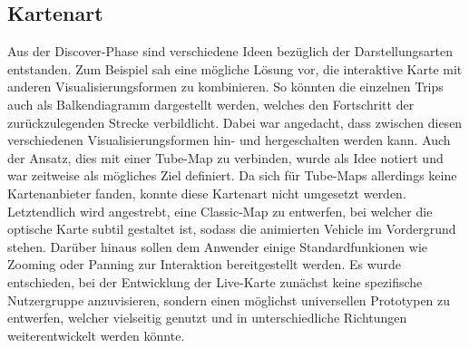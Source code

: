 \subsection{Kartenart}
\label{ssub:kartenart}
  Aus der Discover-Phase sind verschiedene Ideen bezüglich der Darstellungsarten entstanden. Zum Beispiel sah eine mögliche Lösung vor, die interaktive Karte mit anderen Visualisierungsformen zu kombinieren. So könnten die einzelnen Trips auch als Balkendiagramm dargestellt werden, welches den Fortschritt der zurückzulegenden Strecke verbildlicht. Dabei war angedacht, dass zwischen diesen verschiedenen Visualisierungsformen hin- und hergeschalten werden kann. Auch der Ansatz, dies mit einer Tube-Map zu verbinden, wurde als Idee notiert und war zeitweise als mögliches Ziel definiert. Da sich für Tube-Maps allerdings keine Kartenanbieter fanden, konnte diese Kartenart nicht umgesetzt werden.
  Letztendlich wird angestrebt, eine Classic-Map zu entwerfen, bei welcher die optische Karte subtil gestaltet ist, sodass die animierten Vehicle im Vordergrund stehen. Darüber hinaus sollen dem Anwender einige Standardfunkionen wie Zooming oder Panning zur Interaktion bereitgestellt werden.
  Es wurde entschieden, bei der Entwicklung der Live-Karte zunächst keine spezifische Nutzergruppe anzuvisieren, sondern einen möglichst universellen Prototypen zu entwerfen, welcher vielseitig genutzt und in unterschiedliche Richtungen weiterentwickelt werden könnte.  

